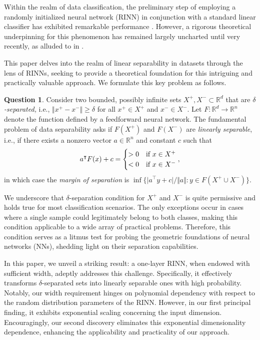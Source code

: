 \documentclass[aoap]{imsart}
\numberwithin{equation}{section}
\theoremstyle{definition}
\newtheorem{question}[theorem]{Question}
\theoremstyle{remark}
\newcommand{\R}{\mathbb{R}} %
\numberwithin{equation}{section}
\newcommand{\0}{\mathbf{0}}
\newcommand{\1}{\mathbf{1}}
\numberwithin{equation}{section}
\begin{document}
Within the realm of data classification, the preliminary step of employing a randomly initialized neural network (RINN) in conjunction with a standard linear classifier has exhibited remarkable performance \cite{rahimi2008weighted, zhang2016understanding}. However, a rigorous theoretical underpinning for this phenomenon has remained largely uncharted until very recently, as alluded to in \cite{an2015can, dirksen2021separation}.

This paper delves into the realm of linear separability in datasets through the lens of RINNs, seeking to provide a theoretical foundation for this intriguing and practically valuable approach. We formulate this key problem as follows.
\begin{question}
Consider two bounded, possibly infinite sets $X^{+}, X^{-}\subset \mathbb{R}^d$ that are \emph{$\delta$-separated,} i.e., $\Vert x^{+}-x^{-}\Vert \geq \delta$ for all $x^{+}\in X^{+}$ and $x^{-}\in X^{-}$. Let $F: \mathbb{R}^d \to \mathbb{R}^{n}$ denote the function defined by a feedforward neural network. The fundamental problem of data separability asks if $F(X^{+})$ and $F(X^{-})$ are \emph{linearly separable}, i.e., if there exists a nonzero vector $a\in \R^n$ and constant $c$ such that
\[{a^{\intercal}F(x)+c}=\begin{cases}
> 0 &\textup{if }x\in X^{+}\\
< 0 &\textup{if }x\in X^{-}
\end{cases},\]
in which case the \emph{margin of separation} is $\inf\lbrace \vert a^{\intercal}y+c\vert/\Vert a\Vert :y\in F(X^{+}\cup X^{-})\rbrace$.
\end{question}






We underscore that $\delta$-separation condition for $X^+$ and $X^-$ is quite permissive and holds true for most classification scenarios. The only exceptions occur in cases where a single sample could legitimately belong to both classes, making this condition applicable to a wide array of practical problems. Therefore, this condition serves as a litmus test for probing the geometric foundations of neural networks (NNs), shedding light on their separation capabilities.

In this paper, we unveil a striking result: a one-layer RINN, when endowed with sufficient width, adeptly addresses this challenge. Specifically, it effectively transforms $\delta$-separated sets into linearly separable ones with high probability. Notably, our width requirement hinges on polynomial dependency with respect to the random distribution parameters of the RINN. However, in our first principal finding, it exhibits exponential scaling concerning the input dimension. Encouragingly, our second discovery eliminates this exponential dimensionality dependence, enhancing the applicability and practicality of our approach.
\end{document}
